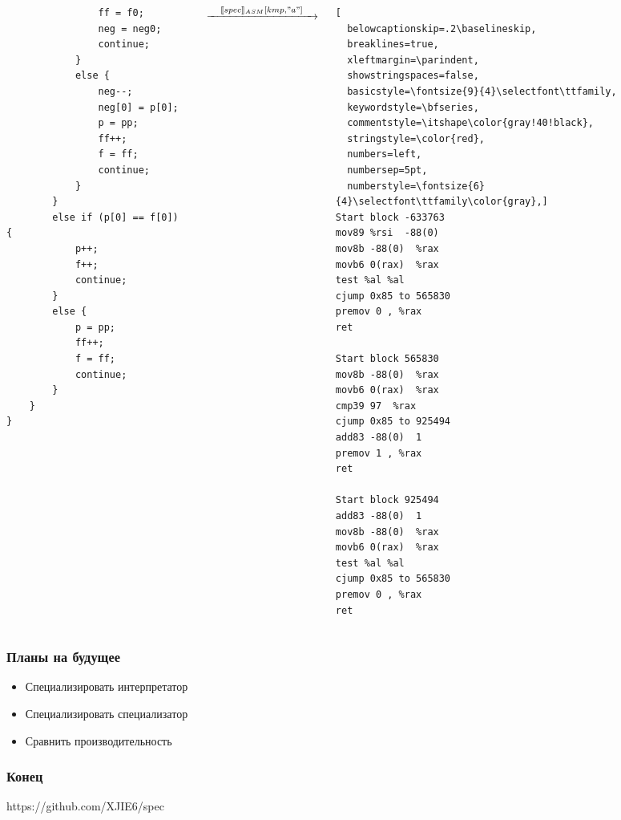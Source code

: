 \documentclass[demo]{beamer}
\begin{document}
\begin{frame}[fragile]
\begin{columns}
\begin{column}{0.2\textwidth}
\begin{lstlisting}
                ff = f0;
                neg = neg0;
                continue;
            }
            else {
                neg--;
                neg[0] = p[0];
                p = pp;
                ff++;
                f = ff;
                continue;
            }
        }
        else if (p[0] == f[0]) {
            p++;
            f++;
            continue;
        }
        else {
            p = pp;
            ff++;
            f = ff;
            continue;
        }
    }
}
\end{lstlisting}
\end{column}
\begin{column}{0.4\textwidth}
$$\xrightarrow{\quad \llbracket spec \rrbracket_{ASM}[kmp, "a"] \quad}$$
\end{column}
\begin{column}{0.4\textwidth}
\begin{lstlisting}[
  belowcaptionskip=.2\baselineskip,
  breaklines=true,
  xleftmargin=\parindent,
  showstringspaces=false,
  basicstyle=\fontsize{9}{4}\selectfont\ttfamily,
  keywordstyle=\bfseries,
  commentstyle=\itshape\color{gray!40!black},
  stringstyle=\color{red},
  numbers=left,
  numbersep=5pt,
  numberstyle=\fontsize{6}{4}\selectfont\ttfamily\color{gray},]
Start block -633763
mov89 %rsi  -88(0) 
mov8b -88(0)  %rax 
movb6 0(rax)  %rax 
test %al %al
cjump 0x85 to 565830
premov 0 , %rax 
ret

Start block 565830
mov8b -88(0)  %rax 
movb6 0(rax)  %rax 
cmp39 97  %rax 
cjump 0x85 to 925494
add83 -88(0)  1
premov 1 , %rax 
ret

Start block 925494
add83 -88(0)  1
mov8b -88(0)  %rax 
movb6 0(rax)  %rax 
test %al %al
cjump 0x85 to 565830
premov 0 , %rax 
ret
\end{lstlisting}
\end{column}
\end{columns}
\end{frame}

\begin{frame}\frametitle{Планы на будущее}

\begin{itemize}
\item Специализировать интерпретатор
\vfill 
\item Специализировать специализатор
\vfill
\item Сравнить производительность
\end{itemize}

\end{frame}

\begin{frame}\frametitle{Конец}
https://github.com/XJIE6/spec
\end{frame}
\end{document}
